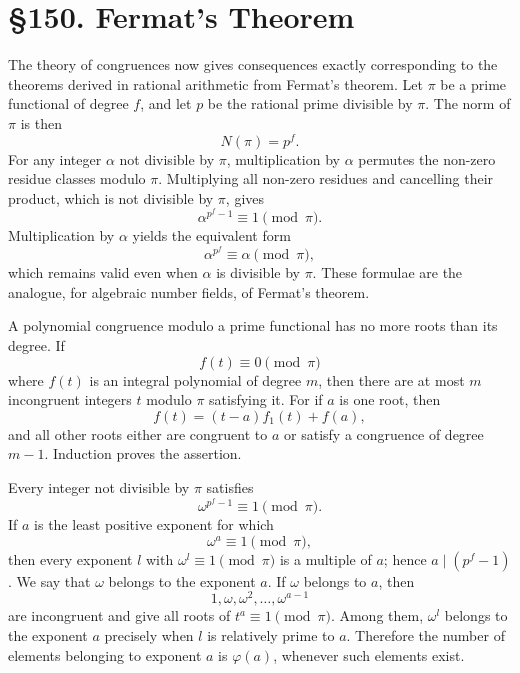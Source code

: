 \documentclass[12pt,a4paper]{article}
\newcommand{\webersection}[2]{\clearpage\section*{\S #1. #2}}
\begin{document}
\webersection{150}{Fermat's Theorem}

The theory of congruences now gives consequences exactly corresponding to the theorems derived in rational arithmetic from Fermat's theorem.  Let \(\pi\) be a prime functional of degree \(f\), and let \(p\) be the rational prime divisible by \(\pi\).  The norm of \(\pi\) is then
\[
 N(\pi)=p^f.
\]
For any integer \(\alpha\) not divisible by \(\pi\), multiplication by \(\alpha\) permutes the non-zero residue classes modulo \(\pi\).  Multiplying all non-zero residues and cancelling their product, which is not divisible by \(\pi\), gives
\begin{equation}
 \alpha^{p^f-1}\equiv 1\pmod{\pi}. \tag{1}
\end{equation}
Multiplication by \(\alpha\) yields the equivalent form
\begin{equation}
 \alpha^{p^f}\equiv \alpha\pmod{\pi}, \tag{2}
\end{equation}
which remains valid even when \(\alpha\) is divisible by \(\pi\).  These formulae are the analogue, for algebraic number fields, of Fermat's theorem.

A polynomial congruence modulo a prime functional has no more roots than its degree.  If
\begin{equation}
 f(t)\equiv 0\pmod{\pi} \tag{3}
\end{equation}
where \(f(t)\) is an integral polynomial of degree \(m\), then there are at most \(m\) incongruent integers \(t\) modulo \(\pi\) satisfying it.  For if \(a\) is one root, then
\[
 f(t)=(t-a)f_1(t)+f(a),
\]
and all other roots either are congruent to \(a\) or satisfy a congruence of degree \(m-1\).  Induction proves the assertion.

Every integer not divisible by \(\pi\) satisfies
\begin{equation}
 \omega^{p^f-1}\equiv 1\pmod{\pi}. \tag{4}
\end{equation}
If \(a\) is the least positive exponent for which
\[
 \omega^a\equiv1\pmod{\pi},
\]
then every exponent \(l\) with \(\omega^l\equiv1\pmod{\pi}\) is a multiple of \(a\); hence \(a\mid(p^f-1)\).  We say that \(\omega\) belongs to the exponent \(a\).  If \(\omega\) belongs to \(a\), then
\[
 1,\omega,\omega^2,
\ldots,\omega^{a-1}
\]
are incongruent and give all roots of \(t^a\equiv1\pmod{\pi}\).  Among them, \(\omega^l\) belongs to the exponent \(a\) precisely when \(l\) is relatively prime to \(a\).  Therefore the number of elements belonging to exponent \(a\) is \(\varphi(a)\), whenever such elements exist.
\end{document}
